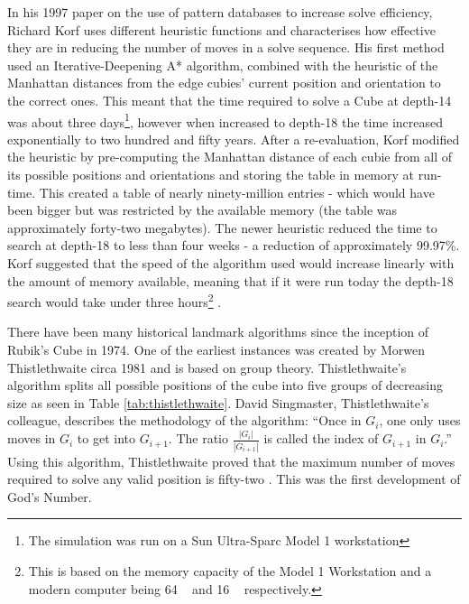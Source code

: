 \documentclass{report}
\newcommand{\depth}[1]{depth-#1}
\begin{document}
    In his 1997 paper \cite{Korf1997} on the use of pattern databases to increase solve efficiency, Richard Korf uses different heuristic functions and characterises how effective they are in reducing the number of moves in a solve sequence. His first method used an Iterative-Deepening A* algorithm, combined with the heuristic of the Manhattan distances from the edge cubies' current position and orientation to the correct ones. This meant that the time required to solve a Cube at \depth{14} was about three days\footnote{The simulation was run on a Sun Ultra-Sparc Model 1 workstation}, however when increased to \depth{18} the time increased exponentially to two hundred and fifty years. After a re-evaluation, Korf modified the heuristic by pre-computing the Manhattan distance of each cubie from all of its possible positions and orientations and storing the table in memory at run-time. This created a table of nearly ninety-million entries - which would have been bigger but was restricted by the available memory (the table was approximately forty-two megabytes). The newer heuristic reduced the time to search at \depth{18} to less than four weeks - a reduction of approximately 99.97\%. Korf suggested that the speed of the algorithm used would increase linearly with the amount of memory available, meaning that if it were run today the \depth{18} search would take under three hours\footnote{This is based on the memory capacity of the Model 1 Workstation and a modern computer being 64 \si{\mega\byte} and 16 \si{\giga\byte} respectively.} \cite{Korf1997}.
    
    There have been many historical landmark algorithms since the inception of Rubik's Cube in 1974. One of the earliest instances was created by Morwen Thistlethwaite circa 1981 and is based on group theory. Thistlethwaite's algorithm splits all possible positions of the cube into five groups of decreasing size as seen in Table \ref{tab:thistlethwaite}. David Singmaster, Thistlethwaite's colleague, describes the methodology of the algorithm: \enquote{Once in $G_i$, one only uses moves in $G_i$ to get into $G_{i+1}$. The ratio $\frac{|G_i|}{|G_{i+1}|}$ is called the index of $G_{i+1}$ in $G_i$.} Using this algorithm, Thistlethwaite proved that the maximum number of moves required to solve any valid position is fifty-two \cite{Singmaster1981}. This was the first development of God's Number.
    
\end{document}

